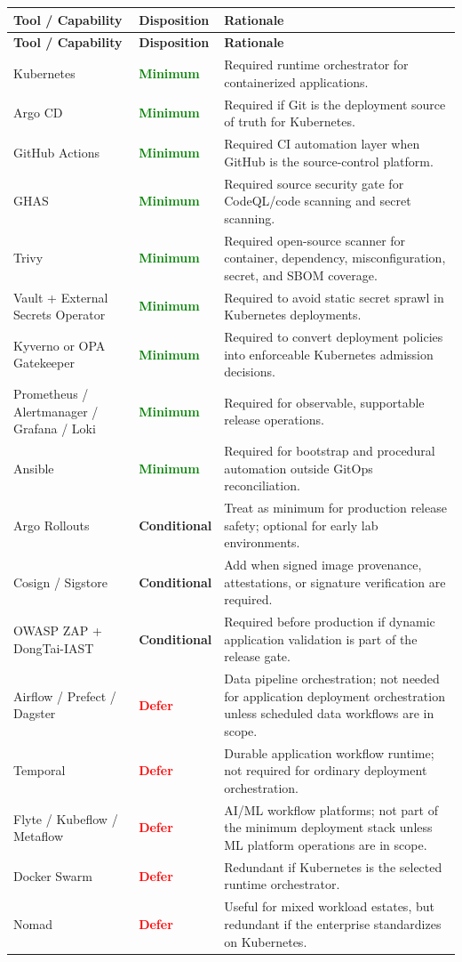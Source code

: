 \documentclass[10pt,letterpaper]{article}
\newcommand{\must}{\textcolor{Green}{\textbf{Minimum}}}
\newcommand{\option}{\textcolor{Amber}{\textbf{Conditional}}}
\newcommand{\defer}{\textcolor{Red}{\textbf{Defer}}}
\begin{document}
\begin{longtable}{L{3.5cm} L{2.3cm} L{8.9cm}}
\toprule
\textbf{Tool / Capability} & \textbf{Disposition} & \textbf{Rationale} \\
\midrule
\endfirsthead
\toprule
\textbf{Tool / Capability} & \textbf{Disposition} & \textbf{Rationale} \\
\midrule
\endhead
\bottomrule
\endfoot
Kubernetes & \must & Required runtime orchestrator for containerized applications. \\
Argo CD & \must & Required if Git is the deployment source of truth for Kubernetes. \\
GitHub Actions & \must & Required CI automation layer when GitHub is the source-control platform. \\
GHAS & \must & Required source security gate for CodeQL/code scanning and secret scanning. \\
Trivy & \must & Required open-source scanner for container, dependency, misconfiguration, secret, and SBOM coverage. \\
Vault + External Secrets Operator & \must & Required to avoid static secret sprawl in Kubernetes deployments. \\
Kyverno or OPA Gatekeeper & \must & Required to convert deployment policies into enforceable Kubernetes admission decisions. \\
Prometheus / Alertmanager / Grafana / Loki & \must & Required for observable, supportable release operations. \\
Ansible & \must & Required for bootstrap and procedural automation outside GitOps reconciliation. \\
Argo Rollouts & \option & Treat as minimum for production release safety; optional for early lab environments. \\
Cosign / Sigstore & \option & Add when signed image provenance, attestations, or signature verification are required.\cite{SigstoreCosignDocs} \\
OWASP ZAP + DongTai-IAST & \option & Required before production if dynamic application validation is part of the release gate. \\
Airflow / Prefect / Dagster & \defer & Data pipeline orchestration; not needed for application deployment orchestration unless scheduled data workflows are in scope.\cite{AirflowHome,PrefectQuickstart,DagsterOverview} \\
Temporal & \defer & Durable application workflow runtime; not required for ordinary deployment orchestration.\cite{TemporalWhatIs} \\
Flyte / Kubeflow / Metaflow & \defer & AI/ML workflow platforms; not part of the minimum deployment stack unless ML platform operations are in scope.\cite{FlyteOSS,KubeflowIntro,MetaflowWhatIs} \\
Docker Swarm & \defer & Redundant if Kubernetes is the selected runtime orchestrator.\cite{DockerSwarm} \\
Nomad & \defer & Useful for mixed workload estates, but redundant if the enterprise standardizes on Kubernetes.\cite{NomadWhatIs} \\
\end{longtable}
\end{document}
